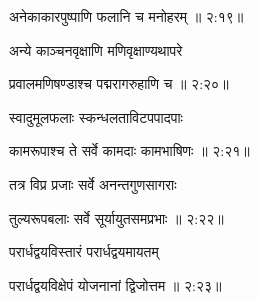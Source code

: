 
{\devanagarifont अनेकाकारपुष्पाणि फलानि च मनोहरम् {॥ २:१९॥} \veg\dontdisplaylinenum }%

{\devanagarifont अन्ये काञ्चनवृक्षाणि मणिवृक्षाण्यथापरे \thinspace{\dandab} \dontdisplaylinenum }%


{\devanagarifont प्रवालमणिषण्डाश्च पद्मरागरुहाणि च {॥ २:२०॥} \veg\dontdisplaylinenum }%

{\devanagarifont स्वादुमूलफलाः स्कन्धलताविटपपादपाः \thinspace{\dandab} \dontdisplaylinenum }%


{\devanagarifont कामरूपाश्च ते सर्वे कामदाः कामभाषिणः {॥ २:२१॥} \veg\dontdisplaylinenum }%
  
{\devanagarifont तत्र विप्र प्रजाः सर्वे अनन्तगुणसागराः \thinspace{\dandab} \dontdisplaylinenum }%
 

{\devanagarifont तुल्यरूपबलाः सर्वे सूर्यायुतसमप्रभाः {॥ २:२२॥} \veg\dontdisplaylinenum }%

{\devanagarifont परार्धद्वयविस्तारं परार्धद्वयमायतम् \thinspace{\dandab} \dontdisplaylinenum }%
 

{\devanagarifont परार्धद्वयविक्षेपं योजनानां द्विजोत्तम {॥ २:२३॥} \veg\dontdisplaylinenum }%

